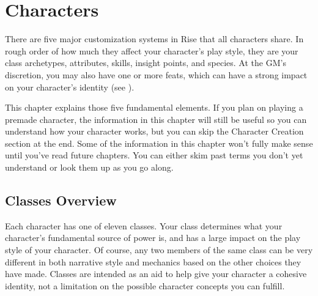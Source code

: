 \chapter{Characters}

There are five major customization systems in Rise that all characters share.
In rough order of how much they affect your character's play style, they are your class archetypes, attributes, skills, insight points, and species.
At the GM's discretion, you may also have one or more feats, which can have a strong impact on your character's identity (see ).

This chapter explains those five fundamental elements.
If you plan on playing a premade character, the information in this chapter will still be useful so you can understand how your character works, but you can skip the Character Creation section at the end.
Some of the information in this chapter won't fully make sense until you've read future chapters.
You can either skim past terms you don't yet understand or look them up as you go along.

\section{Classes Overview}
    Each character has one of eleven classes.
    Your class determines what your character's fundamental source of power is, and has a large impact on the play style of your character.
    Of course, any two members of the same class can be very different in both narrative style and mechanics based on the other choices they have made.
    Classes are intended as an aid to help give your character a cohesive identity, not a limitation on the possible character concepts you can fulfill.

